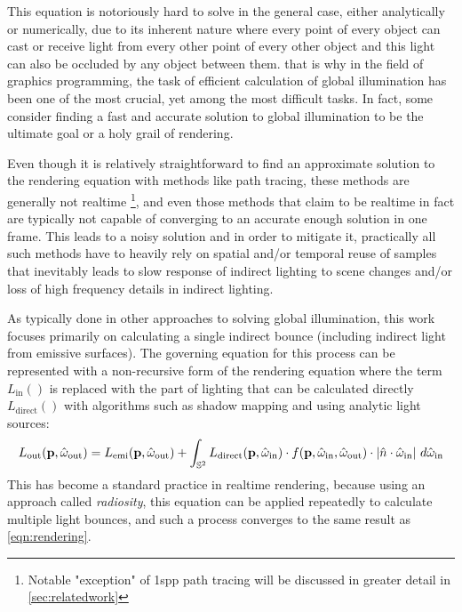 \documentclass{jcgt}
\begin{document}
This equation is notoriously hard to solve in the general case, either analytically or numerically, due to its inherent nature where every point of every object can cast or receive light from every other point of every other object and this light can also be occluded by any object between them. that is why in the field of graphics programming, the task of efficient calculation of global illumination has been one of the most crucial, yet among the most difficult tasks. In fact, some consider finding a fast and accurate solution to global illumination to be the ultimate goal or a holy grail of rendering.

Even though it is relatively straightforward to find an approximate solution to the rendering equation with methods like path tracing, these methods are generally not realtime \footnote{Notable "exception" of 1spp path tracing will be discussed in greater detail in \ref{sec:relatedwork}}, and even those methods that claim to be realtime in fact are typically not capable of converging to an accurate enough solution in one frame. This leads to a noisy solution and in order to mitigate it, practically all such methods have to heavily rely on spatial and/or temporal reuse of samples that inevitably leads to slow response of indirect lighting to scene changes and/or loss of high frequency details in indirect lighting.

As typically done in other approaches to solving global illumination, this work focuses primarily on calculating a single indirect bounce (including indirect light from emissive surfaces). The governing equation for this process can be represented with a non-recursive form of the rendering equation where the term $L_\mathrm{in}()$ is replaced with the part of lighting that can be calculated directly $L_\mathrm{direct}()$ with algorithms such as shadow mapping and using analytic light sources:
\begin{equation}
  L_\mathrm{out}(\textbf{p}, \hat \omega_\mathrm{out}) = L_\mathrm{emi}(\textbf{p}, \hat \omega_\mathrm{out}) + \int_{\mathbb{S}^2} L_\mathrm{direct}(\textbf{p}, \hat \omega_\mathrm{in}) \cdot f(\textbf p, \hat \omega_\mathrm{in}, \hat{\omega}_\mathrm{out}) \cdot |\hat{n} \cdot \hat{\omega}_\mathrm{in} |~ d\hat{\omega}_\mathrm{in}
  \label{eqn:reduced_rendering}
\end{equation}
This has become a standard practice in realtime rendering, because using an approach called \emph{radiosity}, this equation can be applied repeatedly to calculate multiple light bounces, and such a process converges to the same result as \ref{eqn:rendering}.
\end{document}
